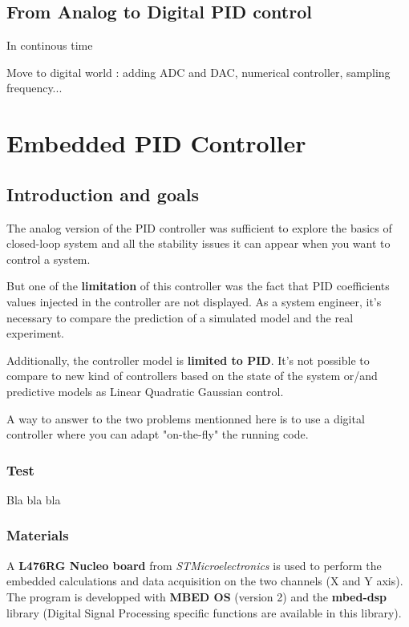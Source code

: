 \documentclass[14pt,fleqn]{book} %
\begin{document}
\chapter{From Analog to Digital PID control}

In continous time

Move to digital world : adding ADC and DAC, numerical controller, sampling frequency...

\part{Embedded PID Controller}
\chapter{Introduction and goals}

The analog version of the PID controller was sufficient to explore the basics of closed-loop system and all the stability issues it can appear when you want to control a system.

But one of the \textbf{limitation} of this controller was the fact that PID coefficients values injected in the controller are not displayed. As a system engineer, it's necessary to compare the prediction of a simulated model and the real experiment. 

Additionally, the controller model is \textbf{limited to PID}. It's not possible to compare to new kind of controllers based on the state of the system or/and predictive models as Linear Quadratic Gaussian control. 

A way to answer to the two problems mentionned here is to use a digital controller where you can adapt "on-the-fly" the running code.

\section{Test}
Bla bla bla

\section{Materials}

A \textbf{L476RG Nucleo board} from \textit{STMicroelectronics} is used to perform the embedded calculations and data acquisition on the two channels (X and Y axis). The program is developped with \textbf{MBED OS} (version 2) and the \textbf{mbed-dsp} library (Digital Signal Processing specific functions are available in this library).
\end{document}
